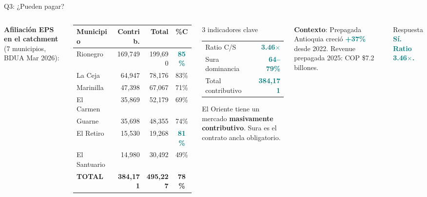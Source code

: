 \documentclass[aspectratio=169, 11pt]{beamer}
\newcommand{\highlight}[1]{\textcolor{teal}{\textbf{#1}}}
\newcommand{\src}[1]{\par\vspace{2pt}{\tiny\textcolor{slate}{Fuente: #1}}}
\begin{document}
\begin{frame}{Q3: ¿Pueden pagar?}

\begin{columns}[T]
\vspace{4pt}
{\small\textbf{Afiliación EPS en el catchment} (7 municipios, BDUA Mar 2026):}

\vspace{4pt}
{\scriptsize
\begin{tabular}{@{}lrrc@{}}
\toprule
\textbf{Municipio} & \textbf{Contrib.} & \textbf{Total} & \textbf{\%C} \\
\midrule
\rowcolor{teal!8}
Rionegro & 169,749 & 199,690 & \highlight{85\%} \\
La Ceja & 64,947 & 78,176 & 83\% \\
Marinilla & 47,398 & 67,067 & 71\% \\
El Carmen & 35,869 & 52,179 & 69\% \\
Guarne & 35,698 & 48,355 & 74\% \\
El Retiro & 15,530 & 19,268 & \highlight{81\%} \\
El Santuario & 14,980 & 30,492 & 49\% \\
\midrule
\rowcolor{teal!10}
\textbf{TOTAL} & \textbf{384,171} & \textbf{495,227} & \textbf{78\%} \\
\bottomrule
\end{tabular}
}

\src{BDUA marzo 2026 (ADRES)}

\vspace{4pt}
\begin{exampleblock}{\small 3 indicadores clave}
\footnotesize
\begin{tabular}{@{}lr@{}}
Ratio C/S & \highlight{3.46$\times$} \\
Sura dominancia & \highlight{64--79\%} \\
Total contributivo & \highlight{384,171} \\
\end{tabular}

\vspace{4pt}
El Oriente tiene un mercado \textbf{masivamente contributivo}. Sura es el contrato ancla obligatorio.
\end{exampleblock}

\vspace{4pt}
{\footnotesize\textbf{Contexto}: Prepagada Antioquia creció \highlight{+37\%} desde 2022. Revenue prepagada 2025: COP \$7.2 billones.}

\vspace{6pt}
\begin{exampleblock}{\small Respuesta}
\centering\large
\highlight{Sí. Ratio 3.46$\times$.}
\end{exampleblock}
\end{columns}
\end{frame}
\end{document}

